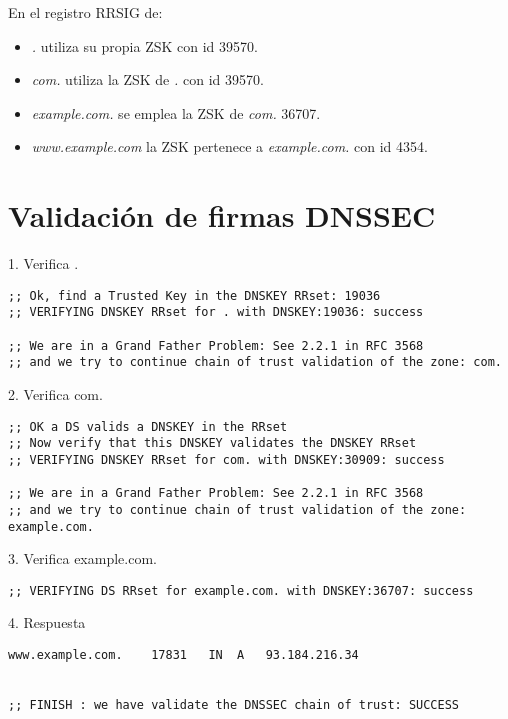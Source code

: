 \documentclass[11pt]{article}
\begin{document}
\medskip

En el registro RRSIG de:

\begin{itemize}
  \item \textit{.} utiliza su propia ZSK con id 39570.
  \item \textit{com.} utiliza la ZSK de \textit{.} con id 39570.
  \item \textit{example.com.} se emplea la ZSK de \textit{com.} 36707.
  \item \textit{www.example.com} la ZSK pertenece a \textit{example.com.} con id
    4354.
\end{itemize}

\section{Validación de firmas DNSSEC}

1. Verifica .

\begin{lstlisting}
;; Ok, find a Trusted Key in the DNSKEY RRset: 19036
;; VERIFYING DNSKEY RRset for . with DNSKEY:19036: success

;; We are in a Grand Father Problem: See 2.2.1 in RFC 3568
;; and we try to continue chain of trust validation of the zone: com.
\end{lstlisting}

\medskip

2. Verifica com.

\begin{lstlisting}
;; OK a DS valids a DNSKEY in the RRset
;; Now verify that this DNSKEY validates the DNSKEY RRset
;; VERIFYING DNSKEY RRset for com. with DNSKEY:30909: success

;; We are in a Grand Father Problem: See 2.2.1 in RFC 3568
;; and we try to continue chain of trust validation of the zone: example.com.
\end{lstlisting}

\medskip

3. Verifica example.com.

\begin{lstlisting}
;; VERIFYING DS RRset for example.com. with DNSKEY:36707: success
\end{lstlisting}

\medskip

4. Respuesta

\begin{lstlisting}
www.example.com.	17831	IN	A	93.184.216.34


;; FINISH : we have validate the DNSSEC chain of trust: SUCCESS
\end{lstlisting}
\end{document}
